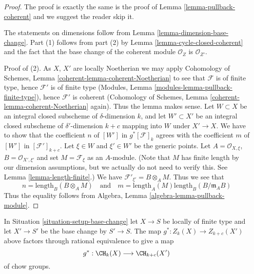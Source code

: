 \begin{proof}
The proof is exactly the same is the proof of
Lemma \ref{lemma-pullback-coherent}
and we suggest the reader skip it.

\medskip\noindent
The statements on dimensions follow from
Lemma \ref{lemma-dimension-base-change}.
Part (1) follows from part (2) by Lemma \ref{lemma-cycle-closed-coherent}
and the fact that the base change of the coherent module $\mathcal{O}_Z$
is $\mathcal{O}_{Z'}$.

\medskip\noindent
Proof of (2). As $X$, $X'$ are locally Noetherian we may apply
Cohomology of Schemes, Lemma \ref{coherent-lemma-coherent-Noetherian} to see
that $\mathcal{F}$ is of finite type, hence $\mathcal{F}'$ is
of finite type (Modules, Lemma \ref{modules-lemma-pullback-finite-type}),
hence $\mathcal{F}'$ is coherent
(Cohomology of Schemes, Lemma \ref{coherent-lemma-coherent-Noetherian} again).
Thus the lemma makes sense. Let $W \subset X$ be an integral closed
subscheme of $\delta$-dimension $k$, and let $W' \subset X'$ be
an integral closed subscheme of $\delta'$-dimension $k + c$ mapping into $W$
under $X' \to X$. We have to show that the coefficient $n$ of
$[W']$ in $g^*[\mathcal{F}]_k$ agrees with the coefficient
$m$ of $[W']$ in $[\mathcal{F}']_{k + c}$. Let $\xi \in W$ and
$\xi' \in W'$ be the generic points. Let
$A = \mathcal{O}_{X, \xi}$, $B = \mathcal{O}_{X', \xi'}$
and set $M = \mathcal{F}_\xi$ as an $A$-module. (Note that
$M$ has finite length by our dimension assumptions, but we
actually do not need to verify this. See
Lemma \ref{lemma-length-finite}.)
We have $\mathcal{F}'_{\xi'} = B \otimes_A M$.
Thus we see that
$$
n = \text{length}_B(B \otimes_A M)
\quad
\text{and}
\quad
m = \text{length}_A(M) \text{length}_B(B/\mathfrak m_AB)
$$
Thus the equality follows from
Algebra, Lemma \ref{algebra-lemma-pullback-module}.
\end{proof}

\begin{lemma}
\label{lemma-pullback-base-change}
In Situation \ref{situation-setup-base-change} let $X \to S$ be locally
of finite type and let $X' \to S'$ be the base change by $S' \to S$.
The map $g^* : Z_k(X) \to Z_{k + c}(X')$ above factors through rational
equivalence to give a map
$$
g^* : \CH_k(X) \longrightarrow \CH_{k + c}(X')
$$
of chow groups.
\end{lemma}

